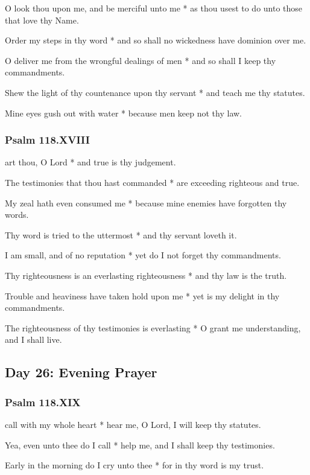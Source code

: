O look thou upon me, and be merciful unto me * as thou usest to do unto those that love thy Name.

Order my steps in thy word * and so shall no wickedness have dominion over me.

O deliver me from the wrongful dealings of men * and so shall I keep thy commandments.

Shew the light of thy countenance upon thy servant * and teach me thy statutes.

Mine eyes gush out with water * because men keep not thy law.

\subsubsection{Psalm 118.XVIII}

 art thou, O Lord * and true is thy judgement.

The testimonies that thou hast commanded * are exceeding righteous and true.

My zeal hath even consumed me * because mine enemies have forgotten thy words.

Thy word is tried to the uttermost * and thy servant loveth it.

I am small, and of no reputation * yet do I not forget thy commandments.

Thy righteousness is an everlasting righteousness * and thy law is the truth.

Trouble and heaviness have taken hold upon me * yet is my delight in thy commandments.

The righteousness of thy testimonies is everlasting * O grant me understanding, and I shall live.

\subsection{Day 26: Evening Prayer}

\subsubsection{Psalm 118.XIX}

 call with my whole heart * hear me, O Lord, I will keep thy statutes.

Yea, even unto thee do I call * help me, and I shall keep thy testimonies.

Early in the morning do I cry unto thee * for in thy word is my trust.

